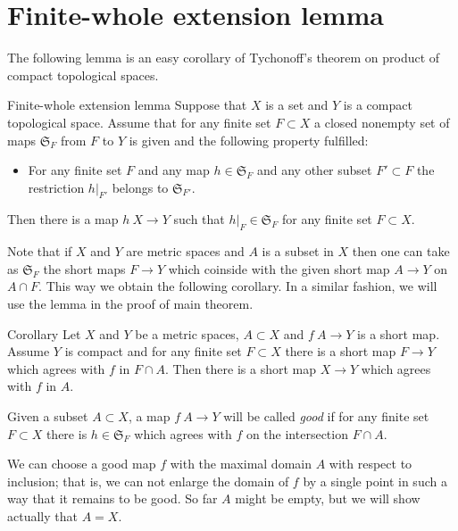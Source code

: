 \documentclass{article}
\begin{document}
\section{Finite-whole extension lemma}\label{Finite-whole extension lemma}

The following lemma is an easy corollary of Tychonoff's theorem on product of compact topological spaces.

\begin{thm}{Finite-whole extension lemma}\label{lem:finite-whole}
Suppose that $X$ is a set 
and $Y$ is a compact topological space.
Assume that for any finite set $F\subset X$ 
a closed nonempty set of maps $\mathfrak{S}_F$ from $F$ to $Y$ is given and the following property fulfilled:
\begin{itemize}
\item For any finite set $F$ and any map $h\in \mathfrak{S}_F$
and any other subset $F'\subset F$
the restriction $h|_{F'}$ belongs to $\mathfrak{S}_{F'}$. 
\end{itemize}

Then there is a map $h\: X\to Y$ such that $h|_F\in \mathfrak{S}_F$ for any finite set $F\subset X$.
\end{thm}

Note that if $X$ and $Y$ are metric spaces and $A$ is a subset in $X$
then one can take as $\mathfrak{S}_F$ the short maps $F\to Y$ which coinside with the given short map $A\to Y$ on $A\cap F$.
This way we obtain the following corollary.
In a similar fashion, we will use the lemma in the proof of main theorem.

\begin{thm}{Corollary}
Let $X$ and $Y$ be a metric spaces, $A\subset X$ and $f\:A\to Y$ is a short map.
Assume $Y$ is compact and for any finite set $F\subset X$ there is a short map $F\to Y$ which agrees with $f$ in $F\cap A$.
Then there is a short map $X\to Y$ which agrees with $f$ in $A$.
\end{thm}

Given a subset $A\subset X$,
a map $f\: A\to Y$ will be called \emph{good}
if for any finite set $F\subset X$
there is $h\in\mathfrak{S}_F$ which agrees with $f$ on the intersection $F\cap A$.

We can choose a good map $f$ with the maximal domain $A$ with respect to inclusion;
that is, we can not enlarge the domain of $f$ by a single point in such a way that it remains to be good.
So far $A$ might be empty, but we will show actually that $A=X$.
\end{document}
